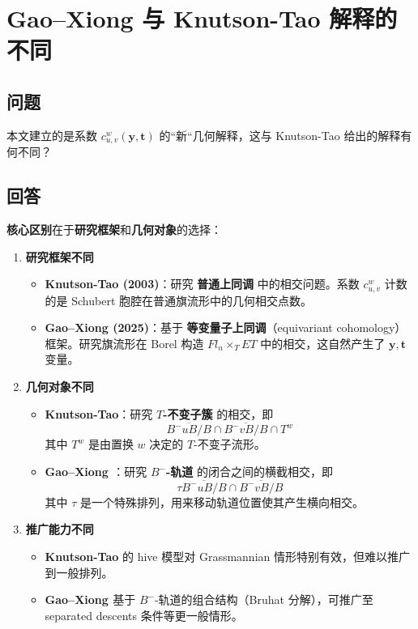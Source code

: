 \section{Gao--Xiong \cite{GX2025} 与 Knutson-Tao 解释的不同}\label{sec:GaoXiongVsKnutsonTao}
\subsection{问题}
本文建立的是系数 $c^w_{u,v}(\mathbf{y}, \mathbf{t})$ 的``新``几何解释，这与 Knutson-Tao \cite{knutson2003} 给出的解释有何不同？
\subsection{回答}
\textbf{核心区别}在于\textbf{研究框架}和\textbf{几何对象}的选择：
\begin{enumerate}
\item \textbf{研究框架不同}
\begin{itemize}
\item \textbf{Knutson-Tao (2003)}：研究 \textbf{普通上同调} 中的相交问题。系数 $c^w_{u,v}$ 计数的是 Schubert 胞腔在普通旗流形中的几何相交点数。
\item \textbf{Gao--Xiong \cite{GX2025} (2025)}：基于 \textbf{等变量子上同调}（equivariant cohomology）框架。研究旗流形在 Borel 构造 $Fl_n \times_T ET$ 中的相交，这自然产生了 $\mathbf{y}, \mathbf{t}$ 变量。
\end{itemize}
\item \textbf{几何对象不同}
\begin{itemize}
\item \textbf{Knutson-Tao}：研究 \textbf{$T$-不变子簇} 的相交，即
$$\overline{B^-uB/B} \cap \overline{B^-vB/B} \cap T^w$$
其中 $T^w$ 是由置换 $w$ 决定的 $T$-不变子流形。
\item \textbf{Gao--Xiong \cite{GX2025}}：研究 \textbf{$B^-$-轨道} 的闭合之间的横截相交，即
$$\tau \overline{B^-uB/B} \cap \overline{B^-vB/B}$$
其中 $\tau$ 是一个特殊排列，用来移动轨道位置使其产生横向相交。
\end{itemize}
\item \textbf{推广能力不同}
\begin{itemize}
\item \textbf{Knutson-Tao} 的 hive 模型对 Grassmannian 情形特别有效，但难以推广到一般排列。
\item \textbf{Gao--Xiong \cite{GX2025}} 基于 $B^-$-轨道的组合结构（Bruhat 分解），可推广至 separated descents 条件等更一般情形。
\end{itemize}
\end{enumerate}

